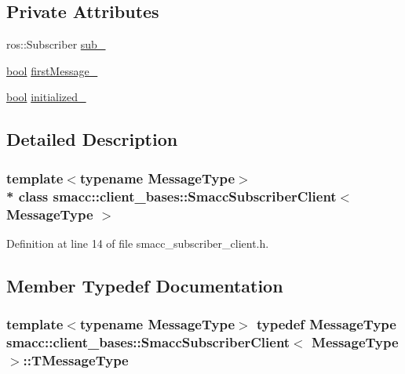 \subsection*{Private Attributes}
\begin{DoxyCompactItemize}
\item 
ros\+::\+Subscriber \hyperlink{classsmacc_1_1client__bases_1_1SmaccSubscriberClient_a0f69a1b0a284ae47f5d717c6ab95f089}{sub\+\_\+}
\item 
\hyperlink{classbool}{bool} \hyperlink{classsmacc_1_1client__bases_1_1SmaccSubscriberClient_a1283e89a0d33a9028a5042519c6869a6}{first\+Message\+\_\+}
\item 
\hyperlink{classbool}{bool} \hyperlink{classsmacc_1_1client__bases_1_1SmaccSubscriberClient_a2096c76f6464d0a513625cc53dba51ed}{initialized\+\_\+}
\end{DoxyCompactItemize}


\subsection{Detailed Description}
\subsubsection*{template$<$typename Message\+Type$>$\\*
class smacc\+::client\+\_\+bases\+::\+Smacc\+Subscriber\+Client$<$ Message\+Type $>$}



Definition at line 14 of file smacc\+\_\+subscriber\+\_\+client.\+h.



\subsection{Member Typedef Documentation}
\subsubsection[{\texorpdfstring{T\+Message\+Type}{TMessageType}}]{\setlength{\rightskip}{0pt plus 5cm}template$<$typename Message\+Type$>$ typedef Message\+Type {\bf smacc\+::client\+\_\+bases\+::\+Smacc\+Subscriber\+Client}$<$ Message\+Type $>$\+::{\bf T\+Message\+Type}}\hypertarget{classsmacc_1_1client__bases_1_1SmaccSubscriberClient_a61d798bda71bf335d72e61928ca561b0}{}\label{classsmacc_1_1client__bases_1_1SmaccSubscriberClient_a61d798bda71bf335d72e61928ca561b0}


